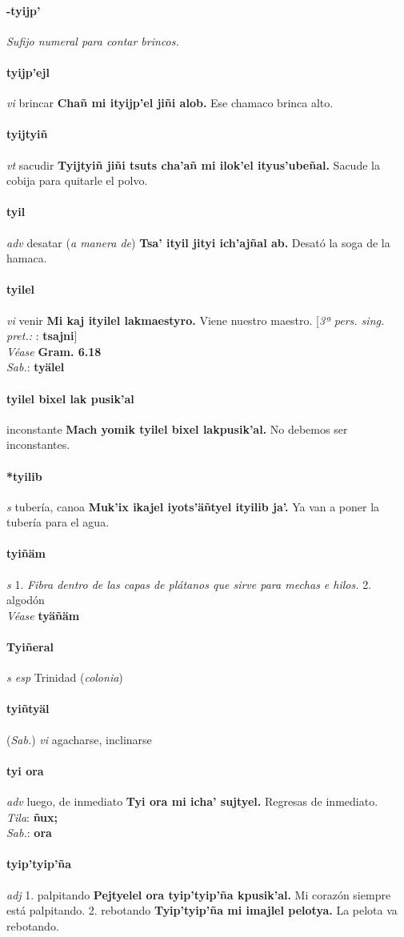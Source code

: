 \documentclass{scrbook}
\newcommand{\entry}[1]{\paragraph{#1}}
\newcommand{\onedefinition}[1]{#1.}
\newcommand{\nontranslationdef}[1]{\textit{#1}}
\newcommand{\partofspeech}[1]{\textit{#1}}
\newcommand{\spanishtranslation}[1]{#1}
\newcommand{\clarification}[1]{(\textit{#1})}
\newcommand{\cholexample}[1]{\textbf{#1}}
\newcommand{\exampletranslation}[1]{#1}
\newcommand{\dialectvariant}[1]{\\\textit{#1}:}
\newcommand{\dialectword}[1]{\textbf{#1}}
\newcommand{\alsosee}[1]{\\\textit{Véase} \textbf{#1}}
\newcommand{\relevantdialect}[1]{(\textit{#1})}
\newcommand{\conjugationtense}[1]{[\textit{#1}}
\newcommand{\otherconjugation}[1]{: \textbf{#1}]}
\begin{document}
\begin{multicols}{2}
\entry{-tyijp'}
\nontranslationdef{Sufijo numeral para contar brincos.}

\entry{tyijp'ejl}
\partofspeech{vi}
\spanishtranslation{brincar}
\cholexample{Chañ mi ityijp'el jiñi alob.}
\exampletranslation{Ese chamaco brinca alto.}

\entry{tyijtyiñ}
\partofspeech{vt}
\spanishtranslation{sacudir}
\cholexample{Tyijtyiñ jiñi tsuts cha'añ mi ilok'el ityus'ubeñal.}
\exampletranslation{Sacude la cobija para quitarle el polvo.}

\entry{tyil}
\partofspeech{adv}
\spanishtranslation{desatar}
\clarification{a manera de}
\cholexample{Tsa' ityil jityi ich'ajñal ab.}
\exampletranslation{Desató la soga de la hamaca.}

\entry{tyilel}
\partofspeech{vi}
\spanishtranslation{venir}
\cholexample{Mi kaj ityilel lakmaestyro.}
\exampletranslation{Viene nuestro maestro.}
\conjugationtense{3ª pers. sing. pret.:}
\otherconjugation{tsajni}
\alsosee{Gram. 6.18}
\dialectvariant{Sab.}
\dialectword{tyälel}

\entry{tyilel bixel lak pusik'al}
\spanishtranslation{inconstante}
\cholexample{Mach yomik tyilel bixel lakpusik'al.}
\exampletranslation{No debemos ser inconstantes.}

\entry{*tyilib}
\partofspeech{s}
\spanishtranslation{tubería, canoa}
\cholexample{Muk'ix ikajel iyots'äñtyel ityilib ja'.}
\exampletranslation{Ya van a poner la tubería para el agua.}

\entry{tyiñäm}
\partofspeech{s}
\onedefinition{1}
\nontranslationdef{Fibra dentro de las capas de plátanos que sirve para mechas e hilos.}
\onedefinition{2}
\spanishtranslation{algodón}
\alsosee{tyäñäm}

\entry{Tyiñeral}
\partofspeech{s esp}
\spanishtranslation{Trinidad}
\clarification{colonia}

\entry{tyiñtyäl}
\relevantdialect{Sab.}
\partofspeech{vi}
\spanishtranslation{agacharse, inclinarse}

\entry{tyi ora}
\partofspeech{adv}
\spanishtranslation{luego, de inmediato}
\cholexample{Tyi ora mi icha' sujtyel.}
\exampletranslation{Regresas de inmediato.}
\dialectvariant{Tila}
\dialectword{ñux;}
\dialectvariant{Sab.}
\dialectword{ora}

\entry{tyip'tyip'ña}
\partofspeech{adj}
\onedefinition{1}
\spanishtranslation{palpitando}
\cholexample{Pejtyelel ora tyip'tyip'ña kpusik'al.}
\exampletranslation{Mi corazón siempre está palpitando.}
\onedefinition{2}
\spanishtranslation{rebotando}
\cholexample{Tyip'tyip'ña mi imajlel pelotya.}
\exampletranslation{La pelota va rebotando.}


\end{multicols}
\end{document}
